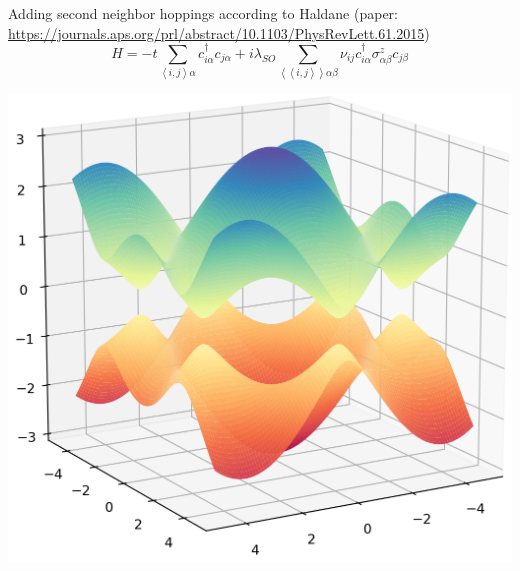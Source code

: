 \documentclass[12pt]{article}
\numberwithin{equation}{section}
\begin{document}

\newpage
\begin{minipage}[c]{0.4\textwidth}
  Adding second neighbor hoppings according to Haldane (paper: \url{https://journals.aps.org/prl/abstract/10.1103/PhysRevLett.61.2015})
  \begin{equation*}
    H =  - t\sum\limits_{\left\langle {i,j} \right\rangle \alpha } {c_{i\alpha }^\dagger {c_{j\alpha }}}  + i{\lambda _{SO}}\sum\limits_{\left\langle {\left\langle {i,j} \right\rangle } \right\rangle \alpha \beta } {{\nu _{ij}}c_{i\alpha }^\dagger \sigma _{\alpha \beta }^z{c_{j\beta }}} 
  \end{equation*}
\end{minipage}
\hfill
\begin{minipage}[c]{0.6\textwidth}
  \includegraphics[width=\textwidth]{./media/haldane_bandstruct_t2=0_m=0dot25-cropped.png}
\end{minipage}

\end{document}
